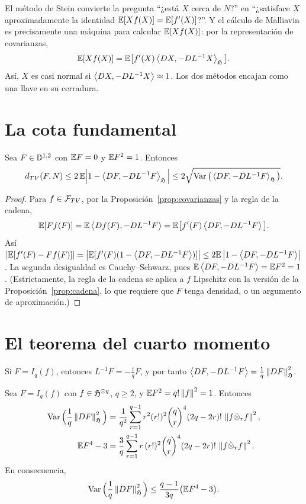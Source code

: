 \begin{intuicion}
El método de Stein convierte la pregunta ``¿está $X$ cerca de $N$?'' en ``¿satisface $X$
aproximadamente la identidad $\mathbb{E}[Xf(X)]=\mathbb{E}[f'(X)]$?''. Y el cálculo de Malliavin es
precisamente una máquina para calcular $\mathbb{E}[Xf(X)]$: por la representación de covarianzas,
\[
  \mathbb{E}[Xf(X)]=\mathbb{E}\big[f'(X)\left\langle DX, -DL^{-1}X\right\rangle_{\mathfrak{H}}\big].
\]
Así, $X$ es casi normal si $\left\langle DX, -DL^{-1}X\right\rangle\approx1$. Los dos métodos encajan como una llave
en su cerradura.
\end{intuicion}

\section{La cota fundamental}

\begin{teorema}\label{teo:nourdin-peccati}
Sea $F\in\mathbb{D}^{1,2}$ con $\mathbb{E} F=0$ y $\mathbb{E} F^2=1$. Entonces
\[
  d_{TV}(F,N)\le2\,\mathbb{E}\Big|1-\left\langle DF, -DL^{-1}F\right\rangle_{\mathfrak{H}}\Big|\le2\sqrt{\operatorname{Var}\big(\left\langle DF, -DL^{-1}F\right\rangle_{\mathfrak{H}}\big)}.
\]
\end{teorema}

\begin{proof}
Para $f\in\mathcal{F}_{TV}$, por la Proposición~\ref{prop:covarianzas} y la regla de la cadena,
\[
  \mathbb{E}[Ff(F)]=\mathbb{E}\left\langle Df(F), -DL^{-1}F\right\rangle=\mathbb{E}\big[f'(F)\left\langle DF, -DL^{-1}F\right\rangle\big].
\]
Así $\left\lvert \mathbb{E}[f'(F)-Ff(F)]\right\rvert=\left\lvert \mathbb{E}[f'(F)(1-\left\langle DF, -DL^{-1}F\right\rangle)]\right\rvert\le2\mathbb{E}\left\lvert 1-\left\langle DF, -DL^{-1}F\right\rangle\right\rvert$. La segunda
desigualdad es Cauchy--Schwarz, pues $\mathbb{E}\left\langle DF, -DL^{-1}F\right\rangle=\mathbb{E} F^2=1$. (Estrictamente, la
regla de la cadena se aplica a $f$ Lipschitz con la versión de la Proposición~\ref{prop:cadena}, lo que requiere
que $F$ tenga densidad, o un argumento de aproximación.)
\end{proof}

\section{El teorema del cuarto momento}
Si $F=I_q(f)$, entonces $L^{-1}F=-\frac1qF$, y por tanto $\left\langle DF, -DL^{-1}F\right\rangle=\frac1q\left\lVert DF\right\rVert^2_{\mathfrak{H}}$.

\begin{lema}\label{lem:cuarto-momento}
Sea $F=I_q(f)$ con $f\in\mathfrak{H}^{\odot q}$, $q\ge2$, y $\mathbb{E} F^2=q!\left\lVert f\right\rVert^2=1$. Entonces
\begin{align*}
  \operatorname{Var}\Big(\frac1q\left\lVert DF\right\rVert^2_{\mathfrak{H}}\Big)&=\frac1{q^2}\sum_{r=1}^{q-1}r^2(r!)^2\binom qr^4(2q-2r)!\,\left\lVert f\tilde\otimes_rf\right\rVert^2,\\
  \mathbb{E} F^4-3&=\frac3q\sum_{r=1}^{q-1}r\,(r!)^2\binom qr^4(2q-2r)!\,\left\lVert f\tilde\otimes_rf\right\rVert^2.
\end{align*}
En consecuencia,
\[
  \operatorname{Var}\Big(\frac1q\left\lVert DF\right\rVert^2_{\mathfrak{H}}\Big)\le\frac{q-1}{3q}\big(\mathbb{E} F^4-3\big).
\]
\end{lema}

